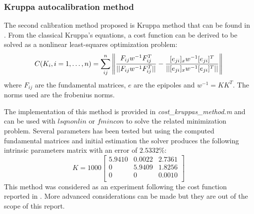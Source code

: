 \documentclass[11pt]{article}
\begin{document}
\subsubsection{Kruppa autocalibration method}
The second calibration method proposed is Kruppa method that can be found in \cite{Prapitasari14} \cite{Pollefeys}. From the classical Kruppa's equations, a cost function can be derived to be solved as a nonlinear least-squares optimization problem:
\begin{equation}
    C(K_i, i = 1,\dots, n) = \sum_{ij}^{n} \norm{\frac{F_{ij}w^{-1}F_{ij}^T}{||F_{ij}w^{-1}F_{ij}^T||} - \frac{[e_{ji}]_xw^{-1}[e_{ji}]^T}{||[e_{ji}]_xw^{-1}[e_{ji}]^T||}}
\end{equation}
where $F_{ij}$ are the fundamental matrices, $e$ are the epipoles and $w^{-1} = KK^T$. The norms used are the frobenius norms.

\bigskip
The implementation of this method is provided in \textit{cost\_kruppas\_method.m} and can be used with $lsqnonlin$ or $fmincon$ to solve the related minimization problem. Several parameters has been tested but using the computed fundamental matrices and initial estimation the solver produces the following intrinsic parameters matrix with an error of $2.5332\%$:
    \begin{equation}
        K = 1000 \begin{bmatrix}
     
     5.9410  &  0.0022   & 2.7361\\
          0  &  5.9409   & 1.8256\\
          0  &       0   & 0.0010\\
\end{bmatrix}
\end{equation}
This method was considered as an experiment following the cost function reported in \cite{Pollefeys}. More advanced considerations can be made but they are out of the scope of this report. 
\newpage
\end{document}
